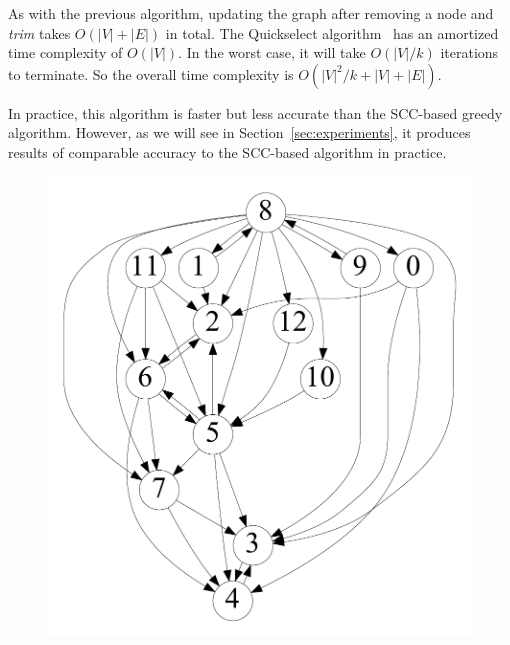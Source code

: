 As with the previous algorithm, updating the graph after removing a node and \emph{trim} takes $O(|V|+|E|)$ in total. The
Quickselect algorithm~\cite{hoare61cacm} has an amortized time complexity of
$O(|V|)$. In the worst case, it will take $O(|V|/k)$ iterations to terminate. So
the overall time complexity is $O(|V|^2/k + |V| + |E|)$.

In practice, this algorithm is faster but less accurate than the SCC-based greedy algorithm. However, as we will see in Section~\ref{sec:experiments}, it produces results of comparable accuracy to the SCC-based algorithm in practice.

\begin{figure}[t]
	\centering
	\begin{minipage}[b]{0.19\linewidth}
		\captionsetup{type=figure}
		\centering
		{\includegraphics[width=\textwidth]{./alg_fig/simple-g0}}
	\end{minipage}
	\begin{minipage}[b]{0.19\linewidth}
		\centering

\end{minipage}
\end{figure}
